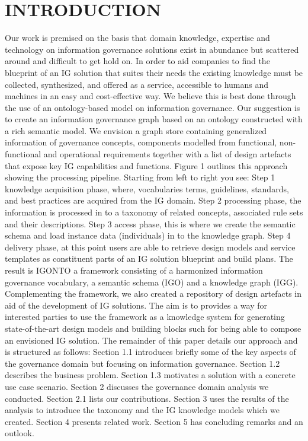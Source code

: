 \section{\uppercase{introduction}}
\label{sec:INTRODUCTION}
Our work is premised on the basis that domain knowledge, expertise and technology on information governance solutions exist in abundance but scattered around and difficult to get hold on. In order to aid companies to find the blueprint of an IG solution that suites their needs the existing knowledge must be collected, synthesized, and offered as a service, accessible to humans and machines in an easy and cost-effective way. We believe this is best done through the use of an ontology-based model on information governance. Our suggestion is to create an information governance graph based on an ontology constructed with a rich semantic model. We envision a graph store containing generalized information of governance concepts, components modelled from functional, non-functional and operational requirements together with a list of design artefacts that expose key IG capabilities and functions. Figure 1 outlines this approach showing the processing pipeline. Starting from left to right you see: Step 1 knowledge acquisition phase, where, vocabularies terms, guidelines, standards, and best practices are acquired from the IG domain. Step 2 processing phase, the information is processed in to a taxonomy of related concepts, associated rule sets and their descriptions. Step 3 access phase, this is where we create the semantic schema and load instance data (individuals) in to the knowledge graph.  Step 4 delivery phase, at this point users are able to retrieve design models and service templates as constituent parts of an IG solution blueprint and build plans. The result is IGONTO a framework consisting of a harmonized information governance vocabulary, a semantic schema (IGO) and a knowledge graph (IGG). Complementing the framework, we also created a repository of design artefacts in aid of the development of IG solutions. The aim is to provides a way for interested parties to use the framework as a knowledge system for generating state-of-the-art design models and building blocks such for being able to compose an envisioned IG solution. 
The remainder of this paper details our approach and is structured as follows: Section 1.1 introduces briefly some of the key aspects of the governance domain but focusing on information governance. Section 1.2 describes the business problem. Section 1.3 motivates a solution with a concrete use case scenario. Section 2 discusses the governance domain analysis we conducted. Section 2.1 lists our contributions. Section 3 uses the results of the analysis to introduce the taxonomy and the IG knowledge models which we created. Section 4 presents related work. Section 5 has concluding remarks and an outlook.

